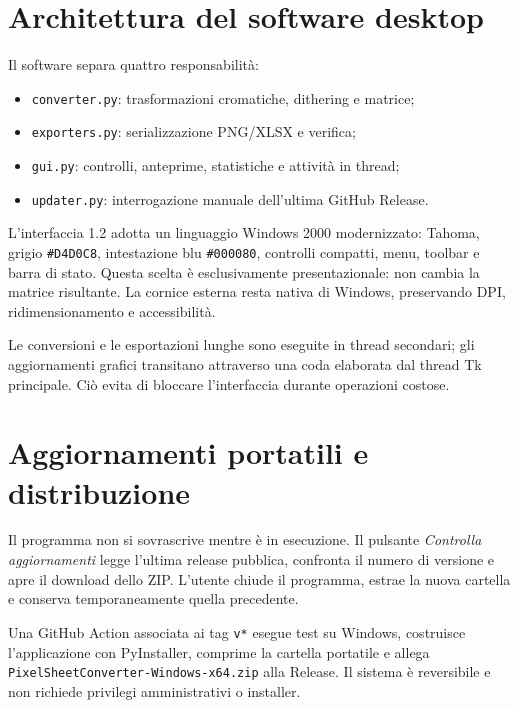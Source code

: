 \documentclass[11pt,a4paper]{article}
\begin{document}
\section{Architettura del software desktop}
Il software separa quattro responsabilità:
\begin{itemize}[leftmargin=*]
\item \texttt{converter.py}: trasformazioni cromatiche, dithering e matrice;
\item \texttt{exporters.py}: serializzazione PNG/XLSX e verifica;
\item \texttt{gui.py}: controlli, anteprime, statistiche e attività in thread;
\item \texttt{updater.py}: interrogazione manuale dell'ultima GitHub Release.
\end{itemize}
L'interfaccia 1.2 adotta un linguaggio Windows 2000 modernizzato: Tahoma, grigio \texttt{\#D4D0C8}, intestazione blu \texttt{\#000080}, controlli compatti, menu, toolbar e barra di stato. Questa scelta è esclusivamente presentazionale: non cambia la matrice risultante. La cornice esterna resta nativa di Windows, preservando DPI, ridimensionamento e accessibilità.

Le conversioni e le esportazioni lunghe sono eseguite in thread secondari; gli aggiornamenti grafici transitano attraverso una coda elaborata dal thread Tk principale. Ciò evita di bloccare l'interfaccia durante operazioni costose.

\section{Aggiornamenti portatili e distribuzione}
Il programma non si sovrascrive mentre è in esecuzione. Il pulsante \emph{Controlla aggiornamenti} legge l'ultima release pubblica, confronta il numero di versione e apre il download dello ZIP. L'utente chiude il programma, estrae la nuova cartella e conserva temporaneamente quella precedente.

Una GitHub Action associata ai tag \texttt{v*} esegue test su Windows, costruisce l'applicazione con PyInstaller, comprime la cartella portatile e allega \texttt{PixelSheetConverter-Windows-x64.zip} alla Release. Il sistema è reversibile e non richiede privilegi amministrativi o installer.
\end{document}
